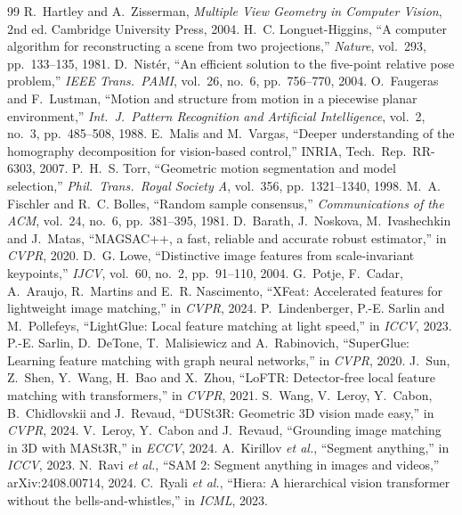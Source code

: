 \documentclass[10pt,a4paper,twocolumn]{article}
\begin{document}
\begin{thebibliography}{99}\small
{} R.~Hartley and A.~Zisserman, \emph{Multiple View Geometry in Computer Vision}, 2nd ed. Cambridge University Press, 2004.
 H.~C. Longuet-Higgins, ``A computer algorithm for reconstructing a scene from two projections,'' \emph{Nature}, vol.~293, pp.~133--135, 1981.
 D.~Nist\'er, ``An efficient solution to the five-point relative pose problem,'' \emph{IEEE Trans.\ PAMI}, vol.~26, no.~6, pp.~756--770, 2004.
 O.~Faugeras and F.~Lustman, ``Motion and structure from motion in a piecewise planar environment,'' \emph{Int.\ J.\ Pattern Recognition and Artificial Intelligence}, vol.~2, no.~3, pp.~485--508, 1988.
 E.~Malis and M.~Vargas, ``Deeper understanding of the homography decomposition for vision-based control,'' INRIA, Tech.\ Rep.\ RR-6303, 2007.
 P.~H.~S. Torr, ``Geometric motion segmentation and model selection,'' \emph{Phil.\ Trans.\ Royal Society A}, vol.~356, pp.~1321--1340, 1998.
 M.~A. Fischler and R.~C. Bolles, ``Random sample consensus,'' \emph{Communications of the ACM}, vol.~24, no.~6, pp.~381--395, 1981.
 D.~Barath, J.~Noskova, M.~Ivashechkin and J.~Matas, ``MAGSAC++, a fast, reliable and accurate robust estimator,'' in \emph{CVPR}, 2020.
 D.~G. Lowe, ``Distinctive image features from scale-invariant keypoints,'' \emph{IJCV}, vol.~60, no.~2, pp.~91--110, 2004.
 G.~Potje, F.~Cadar, A.~Araujo, R.~Martins and E.~R. Nascimento, ``XFeat: Accelerated features for lightweight image matching,'' in \emph{CVPR}, 2024.
 P.~Lindenberger, P.-E. Sarlin and M.~Pollefeys, ``LightGlue: Local feature matching at light speed,'' in \emph{ICCV}, 2023.
 P.-E. Sarlin, D.~DeTone, T.~Malisiewicz and A.~Rabinovich, ``SuperGlue: Learning feature matching with graph neural networks,'' in \emph{CVPR}, 2020.
 J.~Sun, Z.~Shen, Y.~Wang, H.~Bao and X.~Zhou, ``LoFTR: Detector-free local feature matching with transformers,'' in \emph{CVPR}, 2021.
 S.~Wang, V.~Leroy, Y.~Cabon, B.~Chidlovskii and J.~Revaud, ``DUSt3R: Geometric 3D vision made easy,'' in \emph{CVPR}, 2024.
 V.~Leroy, Y.~Cabon and J.~Revaud, ``Grounding image matching in 3D with MASt3R,'' in \emph{ECCV}, 2024.
 A.~Kirillov \emph{et al.}, ``Segment anything,'' in \emph{ICCV}, 2023.
 N.~Ravi \emph{et al.}, ``SAM 2: Segment anything in images and videos,'' arXiv:2408.00714, 2024.
 C.~Ryali \emph{et al.}, ``Hiera: A hierarchical vision transformer without the bells-and-whistles,'' in \emph{ICML}, 2023.

\end{thebibliography}
\end{document}
